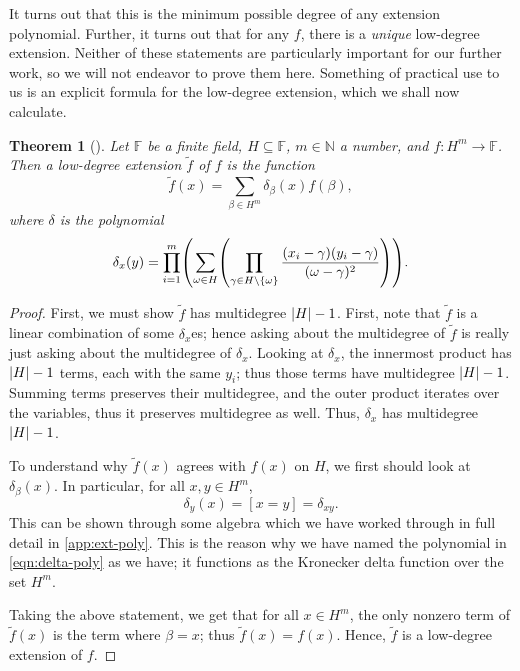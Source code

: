 \documentclass[english,12pt]{reedthesis}
\theoremstyle{plain}
\newtheorem{thm}{Theorem}[section]
\theoremstyle{definition}
\theoremstyle{remark}
\DeclarePairedDelimiter{\abs}{\lvert}{\rvert}
\begin{document}
It turns out that this is the minimum possible degree of any extension
polynomial. Further, it turns out that for any $f$, there is a \emph{unique}
low-degree extension. Neither of these statements are particularly important for
our further work, so we will not endeavor to prove them here. Something of
practical use to us is an explicit formula for the low-degree extension, which
we shall now calculate.

\begin{thm}[{\cite[]{CFGS22}}]\label{thm:low-deg-ext-exists}
  Let $\mathbb{F}$ be a finite field, $H \subseteq \mathbb{F}$, $m \in \mathbb{N}$ a number, and
  $f\colon H^{m} \rightarrow \mathbb{F}$. Then a low-degree extension $\tilde{f}$ of $f$
  is the function
  \begin{equation}
    \tilde{f}(x) = \sum_{\beta \in H^{m}}\delta_{\beta}(x)f(\beta),
  \end{equation}
  where $\delta$ is the polynomial
  \begin{equation}\label{eqn:delta-poly}
    \delta_{x}(y) = \prod_{i = 1}^{m}\mleft(\sum_{\omega \in H}\mleft(
        \prod_{\gamma \in H \setminus \{\omega\}}\frac{(x_{i} - \gamma)(y_{i} - \gamma)}{(\omega - \gamma)^{2}}
      \mright)\mright).
  \end{equation}
\end{thm}

\begin{proof}
  First, we must show $\tilde{f}$ has multidegree $\abs{H} - 1$. First, note
  that $\tilde{f}$ is a linear combination of some $\delta_{x}$es; hence asking about
  the multidegree of $\tilde{f}$ is really just asking about the multidegree of
  $\delta_{x}$. Looking at $\delta_{x}$, the innermost product has $\abs{H} - 1$ terms,
  each with the same $y_{i}$; thus those terms have multidegree $\abs{H} - 1$.
  Summing terms preserves their multidegree, and the outer product iterates over
  the variables, thus it preserves multidegree as well. Thus, $\delta_{x}$ has
  multidegree $\abs{H} - 1$.

  To understand why $\tilde{f}(x)$ agrees with $f(x)$ on $H$, we first should
  look at $\delta_{\beta}(x)$. In particular, for all $x, y \in H^{m}$,
  \begin{equation}\label{eqn:delta-is-delta}
    \delta_{y}(x) = [x = y] = \delta_{xy}.
  \end{equation}
  This can be shown through some algebra which we have worked through in full
  detail in \cref{app:ext-poly}. This is the reason why we have named the
  polynomial in \cref{eqn:delta-poly} as we have; it functions as the Kronecker
  delta function over the set $H^{m}$.

  Taking the above statement, we get that for all $x \in H^{m}$, the only nonzero
  term of $\tilde{f}(x)$ is the term where $\beta = x$; thus $\tilde{f}(x) = f(x)$.
  Hence, $\tilde{f}$ is a low-degree extension of $f$.
\end{proof}
\end{document}
